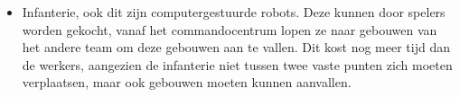 \begin{itemize}
  \item Infanterie, ook dit zijn computergestuurde robots. Deze kunnen door spelers worden gekocht, vanaf het commandocentrum lopen ze naar gebouwen van het andere team om deze gebouwen aan te vallen. Dit kost nog meer tijd dan de werkers, aangezien de infanterie niet tussen twee vaste punten zich moeten verplaatsen, maar ook gebouwen moeten kunnen aanvallen.
\end{itemize} 